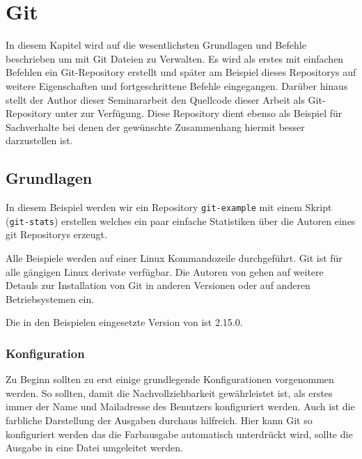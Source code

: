 \chapter{Git}\label{cha:Git}
In diesem Kapitel wird auf die wesentlichsten Grundlagen und Befehle
beschrieben um mit Git Dateien zu Verwalten. Es wird als erstes mit einfachen
Befehlen ein Git-Repository erstellt und später am Beispiel dieses Repositorys
auf weitere Eigenschaften und fortgeschrittene Befehle eingegangen. Darüber
hinaus stellt der Author dieser Seminararbeit den Quellcode dieser Arbeit als
Git-Repository unter \cite{link:seminararbeit} zur Verfügung. Diese Repository
dient ebenso als Beispiel für Sachverhalte bei denen der gewünschte
Zusammenhang hiermit besser darzustellen ist.

\section{Grundlagen}\label{gitbasics}
In diesem Beispiel werden wir ein Repository \texttt{git-example} mit einem
Skript (\texttt{git-stats}) erstellen welches ein paar einfache Statistiken
über die Autoren eines git Repositorys erzeugt.

Alle Beispiele werden auf einer Linux Kommandozeile durchgeführt. Git ist für
alle gängigen Linux derivate verfügbar. Die Autoren von \cite[S.~12-14]{gitpro}
gehen auf weitere Detauls zur Installation von Git in anderen Versionen oder
auf anderen Betriebsystemen ein. 

Die in den Beispielen eingesetzte Version von ist 2.15.0.



\subsection{Konfiguration}\label{gitconfig}
Zu Beginn sollten zu erst einige grundlegende Konfigurationen vorgenommen
werden. So sollten, damit die Nachvollziehbarkeit gewährleistet ist, als erstes
immer der Name und Mailadresse des Benutzers konfiguriert werden. Auch ist die
farbliche Darstellung der Ausgaben durchaus hilfreich. Hier kann Git so
konfiguriert werden das die Farbausgabe automatisch unterdrückt wird, sollte
die Ausgabe in eine Datei umgeleitet werden.




